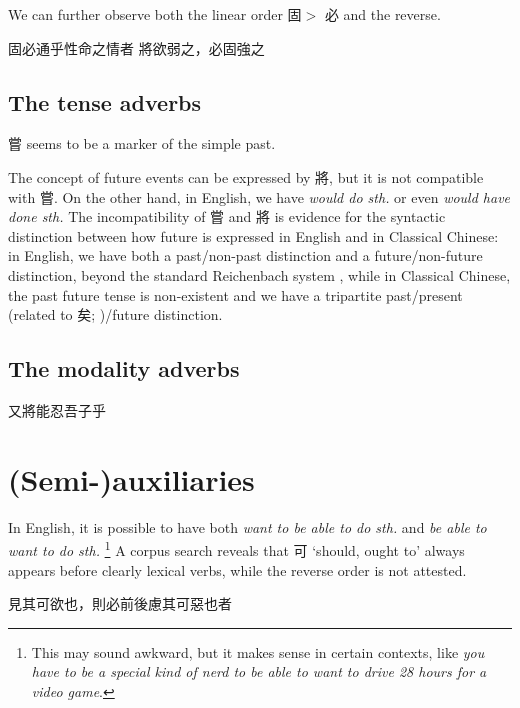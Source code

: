 \documentclass[UTF8, a4paper, oneside, scheme=plain, 12pt]{ctexrep}
\newcommand*{\textgt}{$>$ }
\newcommand{\form}[1]{\emph{#1}}
\newcommand{\translate}[1]{`#1'}
\begin{document}
We can further observe both the linear order 固\textgt 必 and the reverse.

\begin{exe}
    \ex 固必通乎性命之情者
    \ex 將欲弱之，必固強之
\end{exe}

\subsection{The tense adverbs}\label{sec:tam.adverbs.tense}

嘗 seems to be a marker of the simple past.

The concept of future events can be expressed by 將,
but it is not compatible with 嘗.
On the other hand, in English, we have \form{would do sth.} or even \form{would have done sth.}
The incompatibility of 嘗 and 將 is evidence for the syntactic distinction between how future is expressed in English and in Classical Chinese:
in English, we have both a past/non-past distinction and a future/non-future distinction, beyond the standard Reichenbach system \citep{vikner1985reichenbach},
while in Classical Chinese, the past future tense is non-existent and we have a tripartite past/present (related to 矣; )/future distinction.

\subsection{The modality adverbs}

\begin{exe}
    \ex\label{ex:tam.adverb.low-modality.1} 又將能忍吾子乎
\end{exe}

\section{(Semi-)auxiliaries}

In English, it is possible to have both \form{want to be able to do sth.} 
and \form{be able to want to do sth.}%
\footnote{
    This may sound awkward, but it makes sense in certain contexts, like 
    \form{you have to be a special kind of nerd to be able to want to drive 28 hours for a video game}.
}
A corpus search reveals that 可 \translate{should, ought to} always appears before clearly lexical verbs,
while the reverse order is not attested.

\begin{exe}
    \ex 見其可欲也，則必前後慮其可惡也者
\end{exe}
\end{document}

